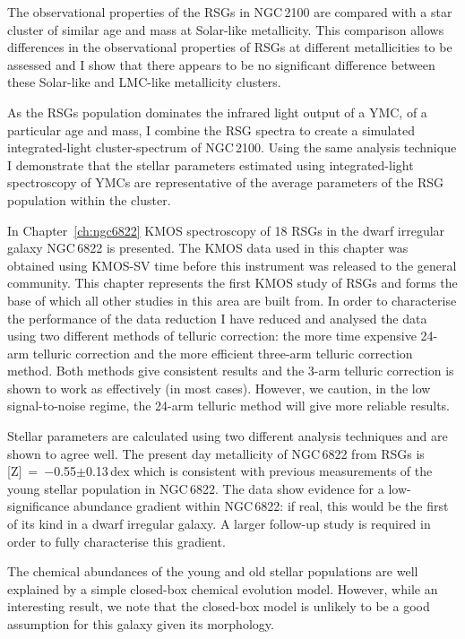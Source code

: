 The observational properties of the RSGs in NGC\,2100 are compared with a star cluster of similar age and mass at Solar-like metallicity.
This comparison allows differences in the observational properties of RSGs at different metallicities to be assessed and I show that there appears to be no significant difference between these Solar-like and LMC-like metallicity clusters.

As the RSGs population dominates the infrared light output of a YMC, of a particular age and mass, I combine the RSG spectra to create a simulated integrated-light cluster-spectrum of NGC\,2100.
Using the same analysis technique I demonstrate that the stellar parameters estimated using integrated-light spectroscopy of YMCs are representative of the average parameters of the RSG population within the cluster.

In Chapter~\ref{ch:ngc6822} KMOS spectroscopy of 18 RSGs in the dwarf irregular galaxy NGC\,6822 is presented.
The KMOS data used in this chapter was obtained using KMOS-SV time before this instrument was released to the general community.
This chapter represents the first KMOS study of RSGs and forms the base of which all other studies in this area are built from.
In order to characterise the performance of the data reduction I have reduced and analysed the data using two different methods of telluric correction: the more time expensive 24-arm telluric correction and the more efficient three-arm telluric correction method.
Both methods give consistent results and the 3-arm telluric correction is shown to work as effectively (in most cases).
However, we caution, in the low signal-to-noise regime, the 24-arm telluric method will give more reliable results.

Stellar parameters are calculated using two different analysis techniques and are shown to agree well.
The present day metallicity of NGC\,6822 from RSGs is
[Z]~=~$-$0.55$\pm$0.13\,dex which is consistent with previous measurements of the young stellar population in NGC\,6822.
The data show evidence for a low-significance abundance gradient within NGC\,6822: if real, this would be the first of its kind in a dwarf irregular galaxy.
A larger follow-up study is required in order to fully characterise this gradient.

The chemical abundances of the young and old stellar populations are well explained by a simple closed-box chemical evolution model.
However, while an interesting result, we note that the closed-box model is unlikely to be a good assumption for this galaxy given its morphology.

